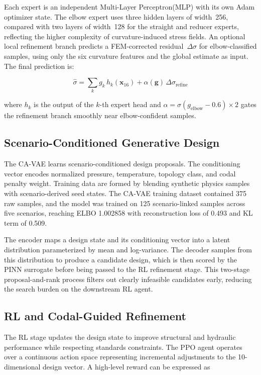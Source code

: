 \documentclass[conference]{IEEEtran}
\begin{document}
Each expert is an independent Multi-Layer Perceptron(MLP) with its own Adam optimizer state. The elbow expert uses three hidden layers of width~256, compared with two layers of width~128 for the straight and reducer experts, reflecting the higher complexity of curvature-induced stress fields. An optional local refinement branch predicts a FEM-corrected residual~$\Delta\sigma$ for elbow-classified samples, using only the six curvature features and the global estimate as input. The final prediction is:

\begin{equation}
\hat{\sigma} = \sum_{k} g_k \, h_k(\mathbf{x}_{16})
             + \alpha(\mathbf{g})\,\Delta\sigma_{\text{refine}}
\label{eq:moe}
\end{equation}

where $h_k$ is the output of the $k$-th expert head and $\alpha = \sigma(g_{\text{elbow}} - 0.6)\times 2$ gates the refinement branch smoothly near elbow-confident samples.

\subsection{Scenario-Conditioned Generative Design}

The CA-VAE learns scenario-conditioned design proposals. The conditioning vector encodes normalized pressure, temperature, topology class, and codal penalty weight. Training data are formed by blending synthetic physics samples with scenario-derived seed states. The CA-VAE training dataset contained 375 raw samples, and the model was trained on 125 scenario-linked samples across five scenarios, reaching ELBO 1.002858 with reconstruction loss of 0.493 and KL term of 0.509.
 
The encoder maps a design state and its conditioning vector into a latent distribution parameterized by mean and log-variance. The decoder samples from this distribution to produce a candidate design, which is then scored by the PINN surrogate before being passed to the RL refinement stage. This two-stage proposal-and-rank process filters out clearly infeasible candidates early, reducing the search burden on the downstream RL agent.
 
\subsection{RL and Codal-Guided Refinement}

The RL stage updates the design state to improve structural and hydraulic performance while respecting standards constraints. The PPO agent operates over a continuous action space representing incremental adjustments to the 10-dimensional design vector. A high-level reward can be expressed as
\end{document}
